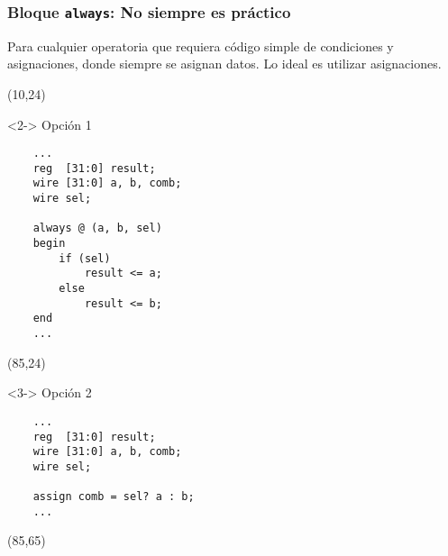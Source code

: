 \documentclass[aspectratio=169]{beamer}
\begin{document}
\begin{frame}[fragile,t]
    \frametitle{Bloque \texttt{always}: No siempre es práctico}
    Para cualquier operatoria que requiera código simple de condiciones y asignaciones, donde siempre se asignan datos.
    \textcolor{verdeuca}{Lo ideal es utilizar asignaciones.}
    \begin{textblock}{60}(10,24)
    \begin{onlyenv}<2->
    Opción 1
\begin{lstlisting}
    ...
    reg  [31:0] result;
    wire [31:0] a, b, comb;
    wire sel;

    always @ (a, b, sel)
    begin
        if (sel)
            result <= a;
        else
            result <= b;
    end
    ...
\end{lstlisting}
    \end{onlyenv}
    \end{textblock}
    \begin{textblock}{60}(85,24)
    \begin{onlyenv}<3->
    Opción 2
\begin{lstlisting}
    ...
    reg  [31:0] result;
    wire [31:0] a, b, comb;
    wire sel;

    assign comb = sel? a : b;
    ...
\end{lstlisting}
    \end{onlyenv}
    \end{textblock}
    \begin{textblock}{60}(85,65)
    \end{textblock}
\end{frame}
\end{document}
